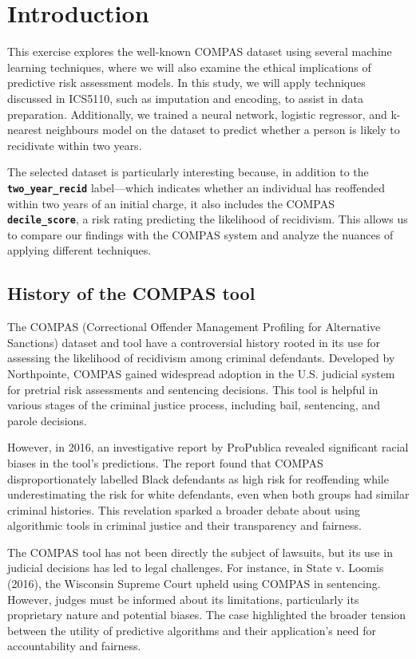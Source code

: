 \section{Introduction}
	This exercise explores the well-known COMPAS dataset using several machine learning techniques, where we will also examine the ethical implications of predictive risk assessment models. In this study, we will apply techniques discussed in ICS5110, such as imputation and encoding, to assist in data preparation. Additionally, we trained a neural network, logistic regressor, and k-nearest neighbours model on the dataset to predict whether a person is likely to recidivate within two years.
	
	The selected dataset is particularly interesting because, in addition to the \textbf{\texttt{two\_year\_recid}} label—which indicates whether an individual has reoffended within two years of an initial charge, it also includes the COMPAS \textbf{\texttt{decile\_score}}, a risk rating predicting the likelihood of recidivism. This allows us to compare our findings with the COMPAS system and analyze the nuances of applying different techniques.



\subsection{History of the COMPAS tool}

	The COMPAS (Correctional Offender Management Profiling for Alternative Sanctions) dataset and tool have a controversial history rooted in its use for assessing the likelihood of recidivism among criminal defendants. Developed by Northpointe, COMPAS gained widespread adoption in the U.S. judicial system for pretrial risk assessments and sentencing decisions. This tool is helpful in various stages of the criminal justice process, including bail, sentencing, and parole decisions.
	
	However, in 2016, an investigative report by ProPublica revealed significant racial biases in the tool's predictions. The report found that COMPAS disproportionately labelled Black defendants as high risk for reoffending while underestimating the risk for white defendants, even when both groups had similar criminal histories. This revelation sparked a broader debate about using algorithmic tools in criminal justice and their transparency and fairness. 
	
	The COMPAS tool has not been directly the subject of lawsuits, but its use in judicial decisions has led to legal challenges. For instance, in State v. Loomis (2016), the Wisconsin Supreme Court upheld using COMPAS in sentencing. However, judges must be informed about its limitations, particularly its proprietary nature and potential biases. The case highlighted the broader tension between the utility of predictive algorithms and their application's need for accountability and fairness.

